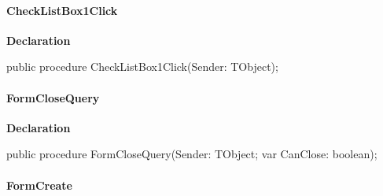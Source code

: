 \documentclass{report}
\newif\ifpdf
\begin{document}
\paragraph*{CheckListBox1Click}\hspace*{\fill}

\label{mnupdate.TUMnForm-CheckListBox1Click}
\begin{list}{}{
\setlength{\itemindent}{0cm}
\setlength{\listparindent}{0cm}
\setlength{\leftmargin}{\evensidemargin}
\addtolength{\leftmargin}{\tmplength}
\settowidth{\labelsep}{X}
\addtolength{\leftmargin}{\labelsep}
\setlength{\labelwidth}{\tmplength}
}
\item[\textbf{Declaration}\hfill]
\ifpdf
\begin{flushleft}
\fi
\begin{ttfamily}
public procedure CheckListBox1Click(Sender: TObject);\end{ttfamily}

\ifpdf
\end{flushleft}
\fi

\end{list}
\paragraph*{FormCloseQuery}\hspace*{\fill}

\label{mnupdate.TUMnForm-FormCloseQuery}
\begin{list}{}{
\setlength{\itemindent}{0cm}
\setlength{\listparindent}{0cm}
\setlength{\leftmargin}{\evensidemargin}
\addtolength{\leftmargin}{\tmplength}
\settowidth{\labelsep}{X}
\addtolength{\leftmargin}{\labelsep}
\setlength{\labelwidth}{\tmplength}
}
\item[\textbf{Declaration}\hfill]
\ifpdf
\begin{flushleft}
\fi
\begin{ttfamily}
public procedure FormCloseQuery(Sender: TObject; var CanClose: boolean);\end{ttfamily}

\ifpdf
\end{flushleft}
\fi

\end{list}
\paragraph*{FormCreate}\hspace*{\fill}
\end{document}
